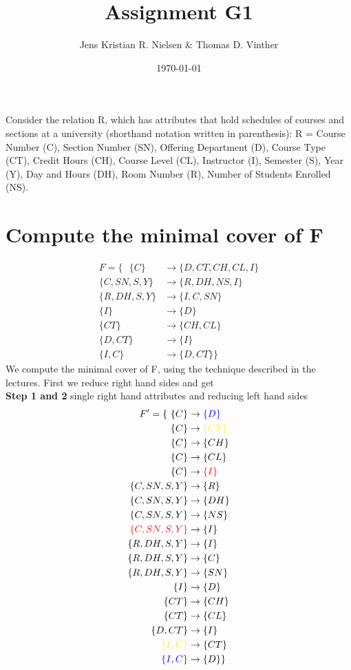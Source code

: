 \documentclass{article}
\theoremstyle{remark}
\numberwithin{equation}{section}
\begin{document}
	\author{Jens Kristian R. Nielsen \& Thomas D. Vinther }
	\title{Assignment G1}
	\date{\today}
	\maketitle
	Consider the relation R, which has attributes that hold schedules of courses and sections at
	a university (shorthand notation written in parenthesis): R = {Course Number (C), Section
		Number (SN), Offering Department (D), Course Type (CT), Credit Hours (CH), Course
		Level (CL), Instructor (I), Semester (S), Year (Y), Day and Hours (DH), Room Number
		(R), Number of Students Enrolled (NS)}.
	
	
	\section{Compute the minimal cover of \textbf{F}}
	\begin{align*}
	F = \{\text{ } \{C\} &\rightarrow \{D,CT,CH,CL,I \}\\
	\{C,SN,S,Y\} &\rightarrow \{R,DH,NS,I \}\\
	\{R,DH,S,Y\} &\rightarrow \{I,C,SN \}\\
	\{I\} &\rightarrow \{D \}\\
	\{CT\} &\rightarrow \{CH,CL\}\\
	\{D,CT\} &\rightarrow \{I \}\\
	\{I,C\} &\rightarrow \{D,CT \}\text{}\}
	\end{align*}
	We compute the minimal cover of F, using the technique described in the lectures. First we reduce right hand sides and get \\\textbf{Step 1 and 2} single right hand attributes and reducing left hand sides
	\begin{align*}
	F' = \{\text{ } 
	\{C\} &\rightarrow \color{blue}\{D \}\\
	\{C\} &\rightarrow \color{yellow}\{CT\}\\
	\{C\} &\rightarrow \{CH \}\\
	\{C\} &\rightarrow \{CL\}\\
	\{C\} &\rightarrow \color{red}\{I \}\\
	\{C,SN,S,Y\} &\rightarrow \{R\}\\
	\{C,SN,S,Y\} &\rightarrow \{DH\}\\
	\{C,SN,S,Y\} &\rightarrow \{NS\}\\
	\color{red}\{C,SN,S,Y\} &\rightarrow \{I\}\\
	\{R,DH,S,Y\} &\rightarrow \{I\}\\
	\{R,DH,S,Y\} &\rightarrow \{C\}\\
	\{R,DH,S,Y\} &\rightarrow \{SN \}\\
	\{I\} &\rightarrow \{D \}\\
	\{CT\} &\rightarrow \{CH\}\\
	\{CT\} &\rightarrow \{CL\}\\
	\{D,CT\} &\rightarrow \{I \}\\
	\color{yellow}\{I,C\} &\rightarrow \{CT\}\\
	\color{blue}\{I,C\} &\rightarrow \{D\}\text{}\}
	\end{align*}
\end{document}
